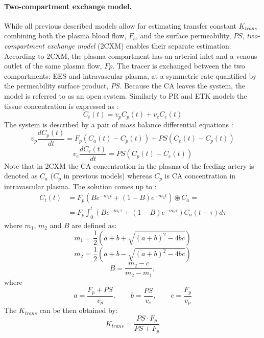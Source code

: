 \paragraph{Two-compartment exchange model.}While all previous described models allow for estimating transfer constant $K_{trans}$ combining both the plasma blood flow, $F_b$, and the surface permeability, $PS$, \textit{two-compartment exchange model} (2CXM) enables their separate estimation. 
According to 2CXM, the plasma compartment has an arterial inlet and a venous outlet of the same plasma flow, $Fp$. 
The tracer is exchanged between the two compartments: EES and intravascular plasma, at a symmetric rate quantified by the permeability surface product, $PS$.
Because the CA leaves the system, the model is referred to as an open system. 
Similarly to PR and ETK models the tissue concentration is expressed as \cite{khalifa2014models}:
\begin{equation}
C_t(t) = v_pC_p(t) + v_eC_e(t)
\label{eq:2cxm}
\end{equation}
The system is described by a pair of mass balance differential equations \cite{khalifa2014models}:  
\begin{equation}
v_p\frac{dC_p(t)}{dt} = F_p(C_a(t)-C_p(t))+PS(C_e(t)-C_p(t))
\label{eq:2cxm2}
\end{equation}
\begin{equation}
v_e\frac{dC_e(t)}{dt} = PS(C_p(t)-C_e(t))
\label{eq:2cxm3}
\end{equation}
Note that in 2CXM the CA concentration in the plasma of the feeding artery is denoted as $C_a$ ($C_p$ in previous models) whereas $C_p$ is CA concentration in intravascular plasma. The solution comes up to \cite{khalifa2014models}:
\begin{align}
	\label{eq:2cxm4}
	\nonumber C_{t}(t) &=F_p (Be^{-m_1t}+(1-B)e^{-m_2t})\circledast C_a =\\
	&= F_{p} \int_{0}^{t} \left( Be^{-m_1\tau} + (1-B)e^{-m_2\tau} \right) C_{a}(t-\tau)d\tau
\end{align}
where $m_1$, $m_2$ and $B$ are defined as:
\begin {equation} 
m_1 = \frac{1}{2}\left( a+b+\sqrt{(a+b)^2-4bc}\right)
\end{equation}
\begin {equation} 
\nonumber m_2 = \frac{1}{2}\left(a+b-\sqrt{(a+b)^2-4bc}\right)
\end{equation}
\begin {equation} 
\nonumber B = \frac{m_2-c}{m_2-m_1}, 
\end{equation}
where
\begin{equation}
a = \frac{F_p+PS}{v_p},\qquad b = \frac{PS}{v_e},\qquad c = \frac{F_p}{v_p}
\end{equation}
The $K_{trans}$ can be then obtained by:
\begin{equation}
K_{trans} = \frac{PS\cdot{}F_p}{PS+F_p}
\end{equation}

